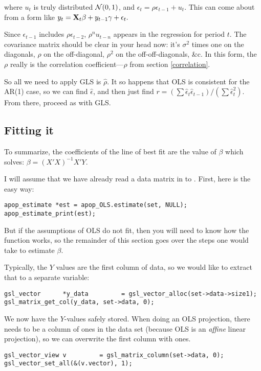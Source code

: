 where $u_t$ is truly distributed ${\cal N}(0,1)$, and $\epsilon_t=
\rho\epsilon_{t-1} + u_t$. This can come about from  a form like
$y_t={\bf X}_t\beta + y_{t-1}\gamma + \epsilon_t.$


Since $\epsilon_{t-1}$ includes $\rho\epsilon_{t-2}$, $\rho^n u_{t-n}$
appears in the regression for period $t$. The covariance matrix should
be clear in your head now: it's $\sigma^2$ times one on the diagonals,
$\rho$ on the off-diagonal, $\rho^2$ on the off-off-diagonals, \&c. In
this form, the $\rho$ really is the correlation coefficient---$\rho$
from section \ref{correlation}.

So all we need to apply GLS is $\hat\rho$. It so happens that OLS is
consistent for the AR(1) case, so we can find $\hat\epsilon$, and then
just find $r=(\sum \hat\epsilon_t \hat\epsilon_{t-1})/(\sum
\hat\epsilon_t^2)$. From there, proceed as with GLS.



\subsection{Fitting it} 
To summarize,
the coefficients of  the line of best fit are the value of $\beta$ which solves:
$ \beta = (X'X)^{-1}X'Y$.

I will assume that we have already read a data matrix in to . First, here is the easy way:
\begin{lstlisting}
apop_estimate *est = apop_OLS.estimate(set, NULL);
apop_estimate_print(est);
\end{lstlisting}
But if the assumptions of OLS do not fit, then you will need to know how
the  function works, so the remainder of this
section goes over the steps one would take to estimate $\beta$.  

 Typically, the $Y$
values are the first column of data, so we would like to extract that to a separate variable:
\begin{lstlisting}
gsl_vector      *y_data         = gsl_vector_alloc(set->data->size1);
gsl_matrix_get_col(y_data, set->data, 0);
\end{lstlisting}

We now have the $Y$-values safely stored.  When doing an OLS projection,
there needs to be a column of ones in the data set (because OLS is an
{\sl affine} linear projection), so we can overwrite the first column
with ones. 
\begin{lstlisting}
gsl_vector_view v         = gsl_matrix_column(set->data, 0);
gsl_vector_set_all(&(v.vector), 1);  
\end{lstlisting}


